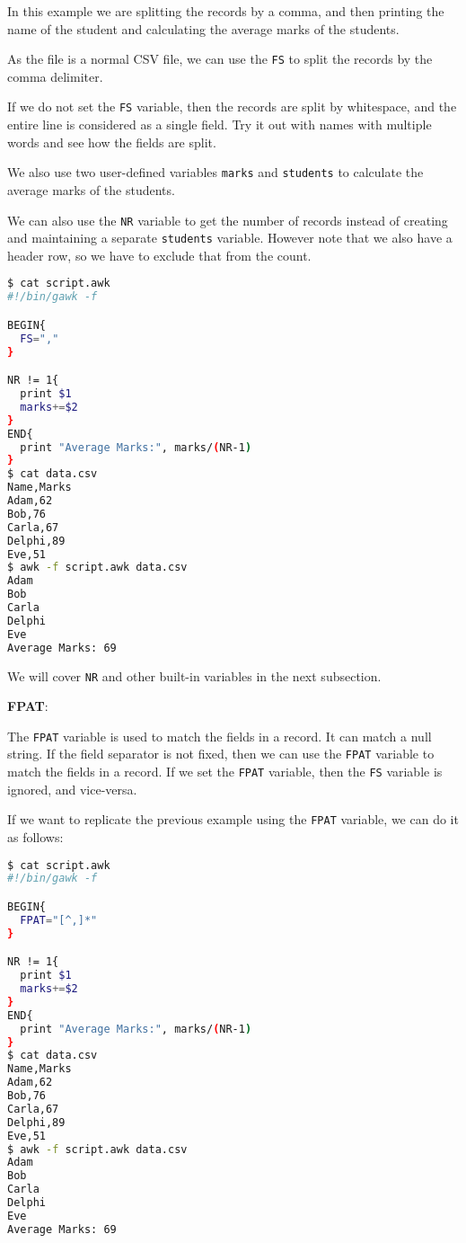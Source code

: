 In this example we are splitting the records by a comma, and then printing the name of the student and calculating the average marks of the students.

As the file is a normal CSV file, we can use the \lstinline|FS| to split the records by the comma delimiter.

If we do not set the \lstinline|FS| variable, then the records are split by whitespace, and the entire line is considered as a single field. Try it out with names with multiple words and see how the fields are split.

We also use two user-defined variables \lstinline|marks| and \lstinline|students| to calculate the average marks of the students.

We can also use the \lstinline|NR| variable to get the number of records instead of creating and maintaining a separate \lstinline|students| variable.
However note that we also have a header row, so we have to exclude that from the count.

\begin{lstlisting}[language=bash]
$ cat script.awk
#!/bin/gawk -f

BEGIN{
  FS=","
}

NR != 1{
  print $1
  marks+=$2
}
END{
  print "Average Marks:", marks/(NR-1)
}
$ cat data.csv
Name,Marks
Adam,62
Bob,76
Carla,67
Delphi,89
Eve,51
$ awk -f script.awk data.csv
Adam
Bob
Carla
Delphi
Eve
Average Marks: 69
\end{lstlisting}

We will cover \lstinline|NR| and other built-in variables in the next subsection.

\textbf{FPAT}:

The \lstinline|FPAT| variable is used to match the fields in a record. It can match a null string.
If the field separator is not fixed, then we can use the \lstinline|FPAT| variable to match the fields in a record.
If we set the \lstinline|FPAT| variable, then the \lstinline|FS| variable is ignored, and vice-versa.

If we want to replicate the previous example using the \lstinline|FPAT| variable, we can do it as follows:

\begin{lstlisting}[language=bash]
$ cat script.awk
#!/bin/gawk -f

BEGIN{
  FPAT="[^,]*"
}

NR != 1{
  print $1
  marks+=$2
}
END{
  print "Average Marks:", marks/(NR-1)
}
$ cat data.csv
Name,Marks
Adam,62
Bob,76
Carla,67
Delphi,89
Eve,51
$ awk -f script.awk data.csv
Adam
Bob
Carla
Delphi
Eve
Average Marks: 69
\end{lstlisting}


